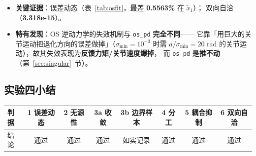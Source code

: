 \documentclass[11pt,a4paper]{ctexart}
\begin{document}
\begin{table}[H]
\centering
\small
\caption{\texttt{os\_invdyn} 在 2R 与 6R 上的实测指标}\label{tab:os_invdyn}
\end{table}

\begin{itemize}[leftmargin=1.6em,itemsep=2pt]
\item \textbf{关键证据}：误差动态（表~\ref{tab:osfit}，最差 \textbf{0.5563\%} 在 $\tilde x_1$）；
  双向自洽（\textbf{3.318e-15}）。
\item \textbf{特有发现}：OS 逆动力学的失效机制与 \texttt{os\_pd} \textbf{完全不同}——
  它靠「用巨大的关节运动把退化方向的误差做掉」（$\sigma_{\min}=10^{-3}$ 时需
  $a/\sigma_{\min}=20$ rad 的关节运动），故其失效表现为\textbf{反馈力矩/关节速度爆掉}，
  而 \texttt{os\_pd} 是\textbf{推不动}（第~\ref{sec:singular}~节）。
\end{itemize}

\subsection{实验四小结}

\begin{table}[H]
\centering
\small
\begin{tabular}{@{}lccccccc@{}}
\toprule
判据 & 1 误差动态 & 2 无源性 & 3a 收敛 & 3b 边界样本 & 4 分工 & 5 耦合抑制 & 6 双向自洽 \\
\midrule
结论 & 通过 & 通过 & 通过 & 如实记录 & 通过 & 通过 & 通过 \\
\bottomrule
\end{tabular}
\end{table}
\end{document}
